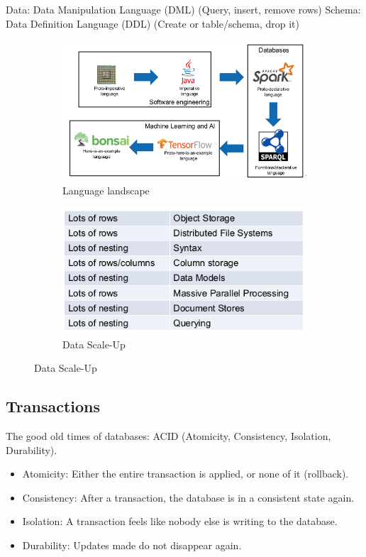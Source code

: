 \documentclass[11pt,oneside,a4paper]{article}
\begin{document}
Data: Data Manipulation Language (DML) (Query, insert, remove rows)
Schema: Data Definition Language (DDL) (Create or table/schema, drop it)
\vspace{-\topsep}
\begin{figure}[hb]
	\centering
	\begin{subfigure}[t]{.5\textwidth}
		\centering
		\includegraphics[width=0.8\linewidth]{figures/language_landscape}
		\caption{Language landscape}
		\label{fig:languagelandscape}
	\end{subfigure}%
	\begin{subfigure}[t]{.5\textwidth}
		\centering
		\includegraphics[width=0.8\linewidth]{figures/scaling_up_overview}
		\caption{Data Scale-Up}
		\label{fig:scalingupoverview}
	\end{subfigure}
\end{figure}
\vspace{-\topsep}

\subsection{Transactions}

The good old times of databases: ACID (Atomicity, Consistency, Isolation, Durability).

\vspace{-\topsep}
\begin{itemize}
	\setlength{\itemsep}{0pt}
	\setlength{\parskip}{0pt}
	\item Atomicity: Either the entire transaction is applied, or none of it (rollback).
	\item Consistency: After a transaction, the database is in a consistent state again.
	\item Isolation: A transaction feels like nobody else is writing to the database.
	\item Durability: Updates made do not disappear again.
\end{itemize}
\vspace{-\topsep}
\end{document}
